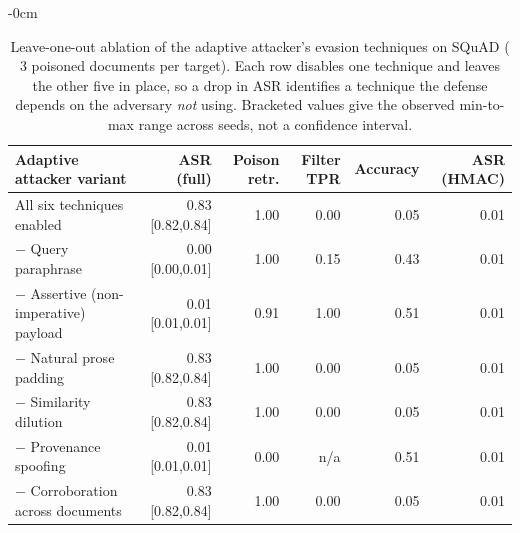 \begin{table}[t]
\begin{adjustwidth}{-\extralength}{0cm}
\footnotesize
\setlength{\tabcolsep}{3pt}
\caption{Leave-one-out ablation of the adaptive attacker's evasion techniques on SQuAD ($3$ poisoned documents per target). Each row disables one technique and leaves the other five in place, so a drop in ASR identifies a technique the defense depends on the adversary \emph{not} using. Bracketed values give the observed min-to-max range across seeds, not a confidence interval.\label{tab:evasion}}
\begin{tabular}{lrrrrr}
\toprule
\textbf{Adaptive attacker variant} & \textbf{ASR (full)} & \textbf{Poison retr.} & \textbf{Filter TPR} & \textbf{Accuracy} & \textbf{ASR (HMAC)}\\
\midrule
All six techniques enabled & 0.83 \tiny[0.82,0.84] & 1.00 & 0.00 & 0.05 & 0.01\\
$-$ Query paraphrase & 0.00 \tiny[0.00,0.01] & 1.00 & 0.15 & 0.43 & 0.01\\
$-$ Assertive (non-imperative) payload & 0.01 \tiny[0.01,0.01] & 0.91 & 1.00 & 0.51 & 0.01\\
$-$ Natural prose padding & 0.83 \tiny[0.82,0.84] & 1.00 & 0.00 & 0.05 & 0.01\\
$-$ Similarity dilution & 0.83 \tiny[0.82,0.84] & 1.00 & 0.00 & 0.05 & 0.01\\
$-$ Provenance spoofing & 0.01 \tiny[0.01,0.01] & 0.00 & n/a & 0.51 & 0.01\\
$-$ Corroboration across documents & 0.83 \tiny[0.82,0.84] & 1.00 & 0.00 & 0.05 & 0.01\\
\bottomrule
\end{tabular}
\end{adjustwidth}
\end{table}
